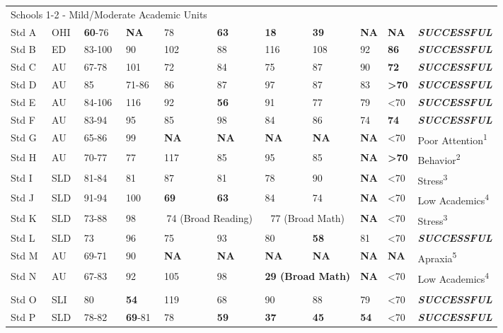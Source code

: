 \documentclass[twoside]{article}
\begin{document}
\begin{tiny}
\begin{landscape}
\begin{longtable}{p{1.5cm}p{1.5cm}p{1.5cm}p{1.5cm}p{1.75cm}p{1.75cm}p{1.75cm}p{1.75cm}p{1.75cm}p{1.75cm}p{2.5cm}@{}}
\multicolumn {5}{l}{Schools 1-2 - Mild/Moderate Academic Units}& & & & & &\\
\cmidrule(lr){1-2}
Std A & OHI & \textbf{60}-76 & \textbf{NA} & 78 & \textbf{63} & \textbf{18} & \textbf{39} & \textbf{NA} & \textbf{NA} & \textbf{\textit{SUCCESSFUL}}\\
Std B & ED & 83-100 & 90 & 102 & 88 & 116 & 108 & 92 & \textbf{86} & \textbf{\textit{SUCCESSFUL}}\\
Std C & AU & 67-78 & 101 & 72 & 84 & 75 & 87 & 90 & \textbf{72} & \textbf{\textit{SUCCESSFUL}}\\
Std D & AU & 85 & 71-86 & 86 & 87 & 97 & 87 & 83 & \textbf{\textgreater70} & \textbf{\textit{SUCCESSFUL}}\\
Std E & AU & 84-106 & 116 & 92 & \textbf{56} & 91 & 77 & 79 & \textless70 & \textbf{\textit{SUCCESSFUL}}\\
Std F & AU & 83-94 & 95 & 85 & 98 & 84 & 86 & 74 & \textbf{74} & \textbf{\textit{SUCCESSFUL}}\\
Std G & AU & 65-86 & 99 & \textbf{NA} & \textbf{NA} & \textbf{NA} & \textbf{NA} & \textbf{NA} & \textless70 & Poor Attention\textsuperscript{1}\\
Std H & AU & 70-77 & 77 & 117 & 85 & 95 & 85 & \textbf{NA} & \textbf{\textgreater70} & Behavior\textsuperscript{2}\\
Std I & SLD & 81-84 & 81 & 87 & 81 & 78 & 90 & \textbf{NA} & \textless70 & Stress\textsuperscript{3}\\
Std J & SLD & 91-94 & 100 & \textbf{69} & \textbf{63} & 84 & 74 & \textbf{NA} & \textless70 & Low Academics\textsuperscript{4}\\
Std K & SLD & 73-88 & 98 & \multicolumn{2}{c}{74 (Broad Reading)} & \multicolumn {2}{c}{77 (Broad Math)} & \textbf{NA} & \textless70 & Stress\textsuperscript{3}\\
Std L & SLD & 73 & 96 & 75 & 93 & 80 & \textbf{58} & 81 & \textless70 & \textbf{\textit{SUCCESSFUL}}\\
Std M & AU & 69-71 & 90 & \textbf{NA} & \textbf{NA} & \textbf{NA} & \textbf{NA} & \textbf{NA} & \textbf{NA} & Apraxia\textsuperscript{5}\\
Std N & AU & 67-83 & 92 & 105 & 98 & \multicolumn{2}{c}{\textbf{29 (Broad Math)}} & \textbf{NA} & \textless70 & Low Academics\textsuperscript{4}\\
\hline\\
Std O & SLI & 80 & \textbf{54} & 119 & 68 & 90 & 88 & 79 & \textless70 & \textbf{\textit{SUCCESSFUL}}\\
Std P & SLD & 78-82 & \textbf{69}-81 & 78 & \textbf{59} & \textbf{37} & \textbf{45} & \textbf{54} & \textless70 & \textbf{\textit{SUCCESSFUL}}\\

\end{longtable}
\end{landscape}
\end{tiny}
\end{document}
